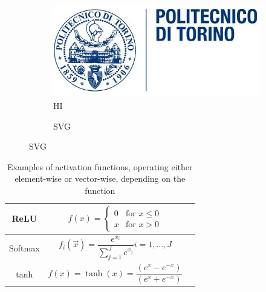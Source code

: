 \begin{figure}[h]
    \centering
    \begin{minipage}[t]{.49\linewidth}
    \begin{figure}[H]
	\centering
	\includegraphics[width=\linewidth]{images/logo/logoPoliTo_with_name_low_quality.jpg}
	\caption{HI}
	\label{fig:c}
    \end{figure}
    \end{minipage}
    \hfill
    \begin{minipage}[t]{.49\linewidth}
    \begin{figure}[H]
	\centering
	
	\caption{SVG}
	\label{fig:svg}
    \end{figure}
    \end{minipage}
\end{figure}

\begin{table}[]
    \centering
    \setcellgapes{3pt}
    \makegapedcells
    \begin{tabular}{|c|c|c}
    \hline
    ReLU & $f(x) = \begin{cases}
	0 & \text{for } x \le 0\\
	x & \text{for } x > 0\end{cases}$ \\ \hline
    Softmax & $f_i(\vec{x}) = \dfrac{e^{x_i}}{\sum_{j=1}^J e^{x_j}} i = 1, ..., J$ \\ \hline
    tanh & $f(x)=\tanh(x)=\dfrac{(e^{x} - e^{-x})}{(e^{x} + e^{-x})}$ \\ \hline
    \end{tabular}
    \caption{Examples of activation functions, operating either element-wise or vector-wise, depending on the function}
    \label{tab:activation_functions}
\end{table}

